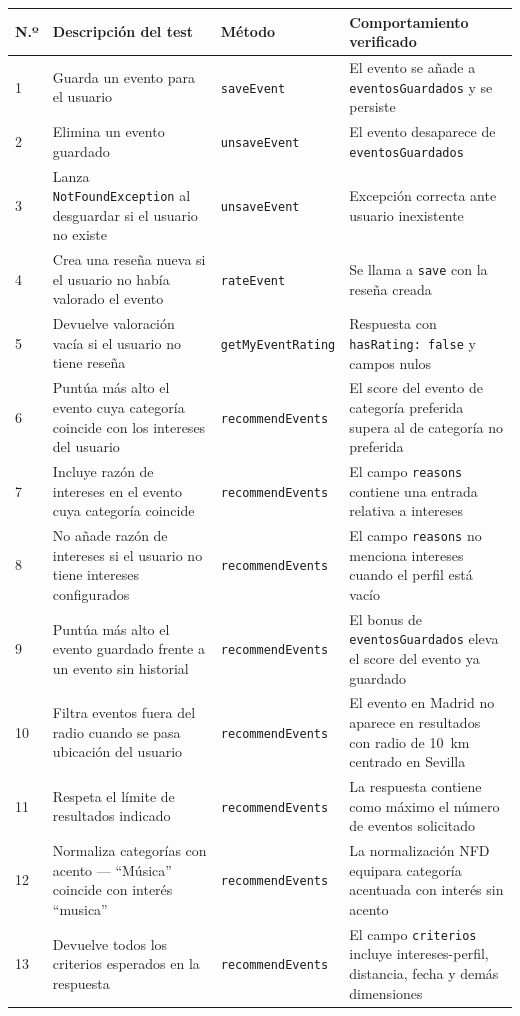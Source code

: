 \begin{longtable}{|p{0.5cm}|p{5.5cm}|p{3.8cm}|p{4.5cm}|}
\hline
\textbf{N.º} & \textbf{Descripción del test} & \textbf{Método} & \textbf{Comportamiento verificado} \\
\hline
1 & Guarda un evento para el usuario & \texttt{saveEvent} & El evento se añade a \texttt{eventosGuardados} y se persiste \\
\hline
2 & Elimina un evento guardado & \texttt{unsaveEvent} & El evento desaparece de \texttt{eventosGuardados} \\
\hline
3 & Lanza \texttt{NotFoundException} al desguardar si el usuario no existe & \texttt{unsaveEvent} & Excepción correcta ante usuario inexistente \\
\hline
4 & Crea una reseña nueva si el usuario no había valorado el evento & \texttt{rateEvent} & Se llama a \texttt{save} con la reseña creada \\
\hline
5 & Devuelve valoración vacía si el usuario no tiene reseña & \texttt{getMyEventRating} & Respuesta con \texttt{hasRating: false} y campos nulos \\
\hline
6 & Puntúa más alto el evento cuya categoría coincide con los intereses del usuario & \texttt{recommendEvents} & El score del evento de categoría preferida supera al de categoría no preferida \\
\hline
7 & Incluye razón de intereses en el evento cuya categoría coincide & \texttt{recommendEvents} & El campo \texttt{reasons} contiene una entrada relativa a intereses \\
\hline
8 & No añade razón de intereses si el usuario no tiene intereses configurados & \texttt{recommendEvents} & El campo \texttt{reasons} no menciona intereses cuando el perfil está vacío \\
\hline
9 & Puntúa más alto el evento guardado frente a un evento sin historial & \texttt{recommendEvents} & El bonus de \texttt{eventosGuardados} eleva el score del evento ya guardado \\
\hline
10 & Filtra eventos fuera del radio cuando se pasa ubicación del usuario & \texttt{recommendEvents} & El evento en Madrid no aparece en resultados con radio de 10~km centrado en Sevilla \\
\hline
11 & Respeta el límite de resultados indicado & \texttt{recommendEvents} & La respuesta contiene como máximo el número de eventos solicitado \\
\hline
12 & Normaliza categorías con acento --- ``Música'' coincide con interés ``musica'' & \texttt{recommendEvents} & La normalización NFD equipara categoría acentuada con interés sin acento \\
\hline
13 & Devuelve todos los criterios esperados en la respuesta & \texttt{recommendEvents} & El campo \texttt{criterios} incluye intereses-perfil, distancia, fecha y demás dimensiones \\
\hline
\end{longtable}

